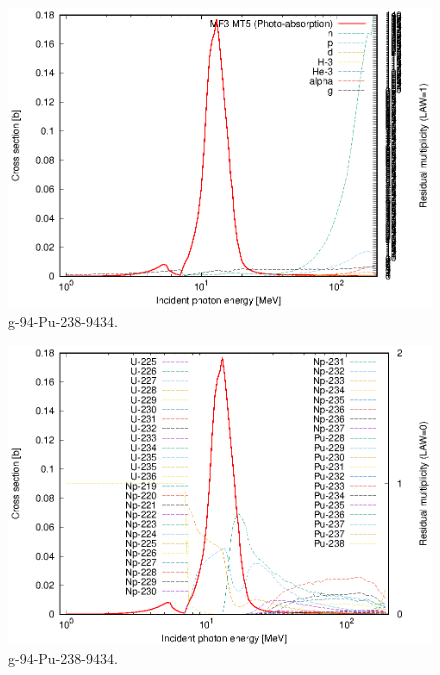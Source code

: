 \begin{figure}
 \includegraphics[width=\linewidth]{eps/g_94-Pu-238_9434.eps}
  \caption{g-94-Pu-238-9434.}
\end{figure}
\begin{figure}
 \includegraphics[width=\linewidth]{eps-law0/g_94-Pu-238_9434.eps}
 \caption{g-94-Pu-238-9434.}
\end{figure}
\newpage \clearpage

